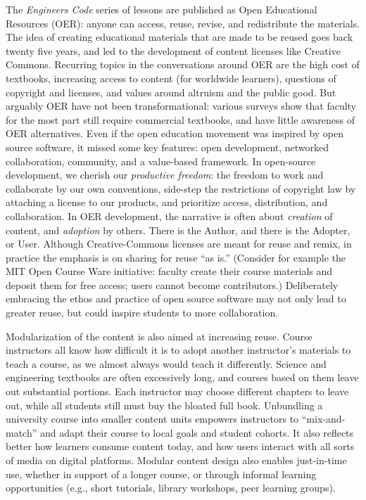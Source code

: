 \documentclass[10pt,journal,compsoc]{IEEEtran}
\begin{document}
The \emph{Engineers Code} series of lessons are published as Open Educational Resources (OER): anyone can access, reuse, revise, and redistribute the materials. 
The idea of creating educational materials that are made to be reused goes back twenty five years, and led to the development of content licenses like Creative Commons. 
Recurring topics in the conversations around OER are the high cost of textbooks, increasing access to content (for worldwide learners), questions of copyright and licenses, and values around altruism and the public good. 
But arguably OER have not been transformational: various surveys show that faculty for the most part still require commercial textbooks, and have little awareness of OER alternatives. 
Even if the open education movement was inspired by open source software, it missed some key features: open development, networked collaboration, community, and a value-based framework. 
In open-source development, we cherish our \emph{productive freedom}: the freedom to work and collaborate by our own conventions, side-step the restrictions of copyright law by attaching a license to our products, and prioritize access, distribution, and collaboration. 
In OER development, the narrative is often about \emph{creation} of content, and \emph{adoption} by others. There is the Author, and there is the Adopter, or User. 
Although Creative-Commons licenses are meant for reuse and remix, in practice the emphasis is on sharing for reuse ``as is.'' 
(Consider for example the MIT Open Course Ware initiative: faculty create their course materials and deposit them for free access; users cannot become contributors.) 
Deliberately embracing the ethos and practice of open source software may not only lead to greater reuse, but could inspire students to more collaboration.

Modularization of the content is also aimed at increasing reuse. 
Course instructors all know how difficult it is to adopt another instructor's materials to teach a course, as we almost always would teach it differently. 
Science and engineering textbooks are often excessively long, and courses based on them leave out substantial portions. 
Each instructor may choose different chapters to leave out, while all students still must buy the bloated full book. 
Unbundling a university course into smaller content units empowers instructors to ``mix-and-match'' and adapt their course to local goals and student cohorts. 
It also reflects better how learners consume content today, and how users interact with all sorts of media on digital platforms. 
Modular content design also enables just-in-time use, whether in support of a longer course, or through informal learning opportunities (e.g., short tutorials, library workshops, peer learning groups). 
\end{document}
